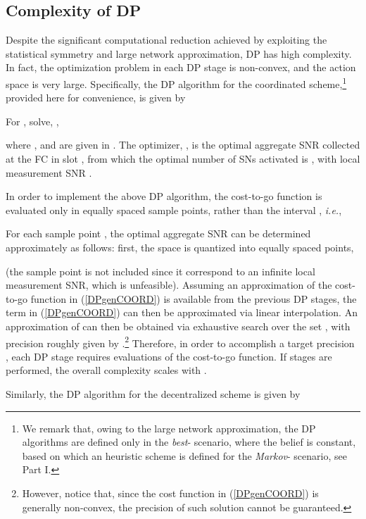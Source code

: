 \documentclass[10pt,twocolumn,twoside]{IEEEtran}
\theoremstyle{plain}
\begin{document}
\vspace{-5mm}
\subsection{{Complexity of DP}}
\label{complanal}
\noindent Despite the significant computational reduction achieved by exploiting
 the statistical symmetry and large network approximation, DP has high complexity.
In fact, the optimization problem in each DP stage is non-convex, and the action space is very large.
Specifically, the DP algorithm for the coordinated scheme,\footnote{We remark that, owing to the large network approximation, the DP algorithms
are defined only in the \emph{best}- scenario, where the belief  is constant, 
 based on which an heuristic scheme is defined
for the \emph{Markov}- scenario, see Part I.} provided here for convenience, is given by

 For , solve, ,
  
where , and  are given in \cite[Prop.~3]{MichelusiP1}. The optimizer, , is the optimal aggregate SNR collected at the FC in slot ,
from which the optimal number of SNs activated is ,
with local measurement SNR .
\hfill\QED

 In order to implement the above DP algorithm,
the cost-to-go function  is evaluated only in
 equally spaced sample points, rather than the  interval ,
\emph{i.e.},
 
For each sample point , the optimal aggregate SNR  can be determined approximately
as follows:
 first, the space  is quantized into  equally spaced  points,
 
  (the sample point  is not included since it correspond to an infinite local measurement SNR, which is unfeasible). 
  Assuming an approximation of the cost-to-go function  in (\ref{DPgenCOORD}) 
  is available from the previous DP stages, the term  in (\ref{DPgenCOORD}) 
  can then be approximated via linear interpolation.
An approximation of  can then be obtained via exhaustive search over the set ,
with precision roughly given by .\footnote{However, notice that, since the cost function in (\ref{DPgenCOORD}) is generally non-convex, the precision of such solution cannot be guaranteed.}
 Therefore, in order to accomplish a target precision ,
  each DP stage requires  evaluations of the cost-to-go function.
 If  stages are performed, the overall complexity scales with .
 
 Similarly, the DP algorithm for the decentralized scheme is given by
 
\end{document}
